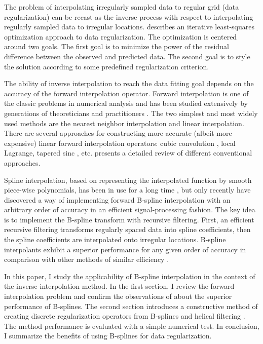 The problem of interpolating irregularly sampled data to regular grid
(data regularization) can be recast as the inverse process with
respect to interpolating regularly sampled data to irregular
locations.  \cite{gee} describes an iterative least-squares
optimization approach to data regularization. The optimization is
centered around two goals. The first goal is to minimize the power of
the residual difference between the observed and predicted data. The
second goal is to style the solution according to some predefined
regularization criterion.
\par
The ability of inverse interpolation to reach the data fitting goal
depends on the accuracy of the forward interpolation operator. Forward
interpolation is one of the classic problems in numerical analysis and
has been studied extensively by generations of theoreticians and
practitioners \cite[]{Fomel.sep.94.sergey2}. The two simplest and most
widely used methods are the nearest neighbor interpolation and linear
interpolation.  There are several approaches for constructing more
accurate (albeit more expensive) linear forward interpolation
operators: cubic convolution \cite[]{keys}, local Lagrange, tapered sinc
\cite[]{Harlan.sep.30.103}, etc. \cite{wolberg} presents a detailed
review of different conventional approaches.
\par
Spline interpolation, based on representing the interpolated function
by smooth piece-wise polynomials, has been in use for a long time
\cite[]{deBoor}, but only recently \cite{unser1,unser2} have
discovered a way of implementing forward B-spline interpolation with
an arbitrary order of accuracy in an efficient signal-processing
fashion. The key idea is to implement the B-spline transform with
recursive filtering. First, an efficient recursive filtering
transforms regularly spaced data into spline coefficients, then the
spline coefficients are interpolated onto irregular locations.
B-spline interpolants exhibit a superior performance for any given
order of accuracy in comparison with other methods of similar
efficiency \cite[]{handbook}.
\par
In this paper, I study the applicability of B-spline interpolation in
the context of the inverse interpolation method. In the first section,
I review the forward interpolation problem and confirm the
observations of \cite{handbook} about the superior performance of
B-splines. The second section introduces a constructive method of
creating discrete regularization operators from B-splines and helical
filtering \cite[]{GEO63-05-15321541}. The method performance is evaluated
with a simple numerical test. In conclusion, I summarize the benefits
of using B-splines for data regularization.

